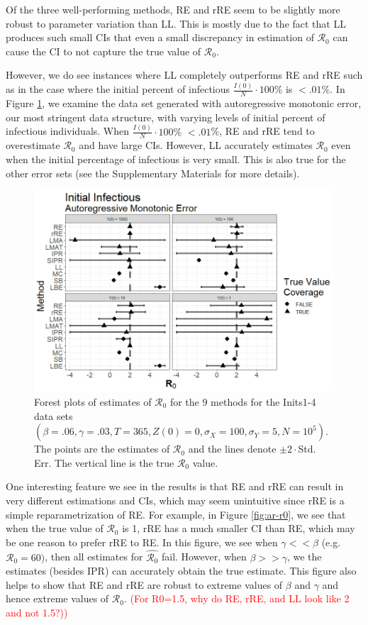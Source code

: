 \documentclass[12pt]{article}
\newcommand{\com}[1]{\textcolor{red}{ #1}}
\newcommand{\xxsir}{\ensuremath{9} } %
\newcommand{\rr}{\ensuremath{\mathcal{R}_0}}
\begin{document}
Of the three well-performing methods, RE and rRE seem to be slightly more robust to parameter variation than LL.  This is mostly due to the fact that LL produces such small CIs that even a small discrepancy in estimation of $\rr$ can cause the CI to not capture the true value of $\rr$.

However, we do see instances where LL completely outperforms RE and rRE such as in the case where the initial percent of infectious $\frac{I(0)}{N} \cdot 100\%$ is $< .01$\%. In Figure \ref{fig:ar-small-I}, we examine the data set generated with autoregressive monotonic error, our most stringent data structure, with varying levels of initial percent of infectious individuals.  When $\frac{I(0)}{N} \cdot 100\%$ $< .01$\%, RE and rRE tend to overestimate $\rr$ and have large CIs.  However, LL accurately estimates $\rr$ even when the initial percentage of infectious is very small.  This is also true for the other error sets (see the Supplementary Materials for more details).

\begin{figure}[H]
	\centering
	\includegraphics[scale=0.5]{images/start_arm.jpg}
	\caption{Forest plots of estimates of $\rr$ for the \xxsir methods for the Inits1-4 data sets $(\beta=.06, \gamma=.03, T=365,  Z(0)=0, \sigma_X=100, \sigma_Y=5, N=10^5)$.  The points are the estimates of $\rr$ and the lines denote $\pm 2\cdot $Std. Err.  The vertical line is the true $\rr$ value.}\label{fig:ar-small-I}
\end{figure}

One interesting feature we see in the results is that RE and rRE can result in very different estimations and CIs, which may seem unintuitive since rRE is a simple reparametrization of RE.  For example, in Figure \ref{fig:ar-r0}, we see that when the true value of $\rr$ is 1, rRE has a much smaller CI than RE, which may be one reason to prefer rRE to RE.  In this figure, we see when $\gamma << \beta$ (e.g. $\rr=60)$, then all estimates for $\hat{\rr}$ fail.  However, when $\beta >> \gamma$, we the estimates (besides IPR) can accurately obtain the true estimate. This figure also helps to show that RE and rRE are robust to extreme values of $\beta$ and $\gamma$ and hence extreme values of $\rr$.  \com{(For R0=1.5, why do RE, rRE, and LL look like 2 and not 1.5?))}
\end{document}
